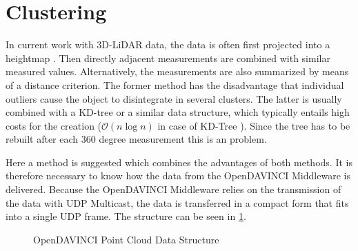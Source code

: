 \documentclass[11pt,oneside,openright]{mpreport}
\begin{document}
\section{Clustering}
In current work with 3D-LiDAR data, the data is often first projected into a heightmap \cite{Zhang,Himmelsbach2009,Li2016}. Then directly adjacent measurements are combined with similar measured values.
Alternatively, the measurements are also summarized by means of a distance criterion. 
The former method has the disadvantage that individual outliers cause the object to disintegrate in several clusters.
The latter is usually combined with a KD-tree or a similar data structure, which typically entails high costs for the creation ($\mathcal{O}(n\log n)$ in case of KD-Tree \cite{Bentley1975}).
Since the tree has to be rebuilt after each 360 degree measurement this is an problem.

Here a method is suggested which combines the advantages of both methods. It is therefore necessary to know how the data from the OpenDAVINCI
Middleware is delivered. Because the OpenDAVINCI Middleware relies on the transmission of the data with UDP Multicast, the data is transferred in a 
compact form that fits into a single UDP frame. The structure can be seen in \cref{odv_ds}.

\begin{figure}[!ht]
\caption{OpenDAVINCI Point Cloud Data Structure}
  \begin{center}
  \end{center}
\label{odv_ds}
\end{figure}
\end{document}
